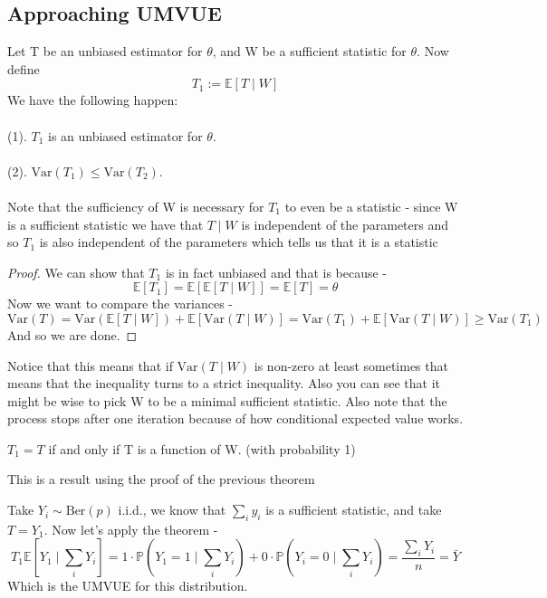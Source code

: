 \documentclass[../main.tex]{subfiles}
\begin{document}
\subsection{Approaching UMVUE}
\begin{theorem}
Let T be an unbiased estimator for $\theta$, and W be a sufficient statistic for $\theta$. Now define
\[T_1 := \mathbb{E}[T\mid W]\]
We have the following happen:\\\\
(1). $T_1$ is an unbiased estimator for $\theta$. \\\\
(2). $\text{Var}(T_1)\leq\text{Var}(T_2)$. \\\\
Note that the sufficiency of W is necessary for $T_1$ to even be a statistic - since W is a sufficient statistic we have that $T\mid W$ is independent of the parameters and so $T_1$ is also independent of the parameters which tells us that it is a statistic 
\end{theorem}
\begin{proof}
We can show that $T_1$ is in fact unbiased and that is because - 
\[\mathbb{E}[T_1] = \mathbb{E}[\mathbb{E}[T\mid W]] = \mathbb{E}[T] = \theta\]
Now we want to compare the variances - 
\[\text{Var}(T) = \text{Var}\left(\mathbb{E}[T\mid W]\right) + \mathbb{E}\left[\text{Var}(T\mid W)\right] = \text{Var}(T_1) + \mathbb{E}[\text{Var}(T\mid W)]\geq \text{Var}(T_1)\]
And so we are done. 
\end{proof}
Notice that this means that if $\text{Var}(T\mid W)$ is non-zero at least sometimes that means that the inequality turns to a strict inequality. Also you can see that it might be wise to pick W to be a minimal sufficient statistic. Also note that the process stops after one iteration because of how conditional expected value works.  
\begin{claim}
$T_1 = T$ if and only if T is a function of W. (with probability 1)
\end{claim}
This is a result using the proof of the previous theorem
\begin{example}
Take $Y_i\sim\text{Ber}(p)$ i.i.d., we know that $\sum_i y_i$ is a sufficient statistic, and take $T=Y_1$. Now let's apply the theorem - 
\[T_1\mathbb{E}\left[Y_1\mid \sum_i Y_i\right] = 1\cdot \mathbb{P}\left(Y_1=1\mid \sum_i Y_i\right) + 0\cdot \mathbb{P}\left(Y_i=0 \mid \sum_i Y_i\right) = \frac{\sum_i Y_i}{n} = \bar{Y}\]
Which is the UMVUE for this distribution. 
\end{example}
\end{document}
